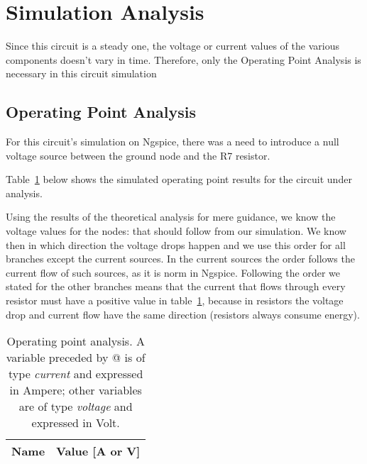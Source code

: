 \section{Simulation Analysis}
\label{sec:simulation}

Since this circuit is a steady one, the voltage or current values of the various components doesn't vary in time. Therefore, only the Operating Point Analysis is necessary in this circuit simulation

\subsection{Operating Point Analysis}

For this circuit's simulation on Ngspice, there was a need to introduce a null voltage source between the ground node and the R7 resistor.

Table~\ref{tab:op} below shows the simulated operating point results for the circuit
under analysis.

Using the results of the theoretical analysis for mere guidance, we know the voltage values for the nodes: that should follow from our simulation. We know then in which direction the voltage drops happen and we use this order for all branches except the current sources. In the current sources the order follows the current flow of such sources, as it is norm in Ngspice. Following the order we stated for the other branches means that the current that flows through every resistor must have a positive value in table~\ref{tab:op}, because in resistors the voltage drop and current flow have the same direction (resistors always consume energy).

\begin{table}[h]
  \centering
  \begin{tabular}{|l|r|}
    \hline    
    {\bf Name} & {\bf Value [A or V]} \\ \hline
    
  \end{tabular}
  \caption{Operating point analysis. A variable preceded by @ is of type {\em current}
    and expressed in Ampere; other variables are of type {\it voltage} and expressed in
    Volt.}
  \label{tab:op}
\end{table}


